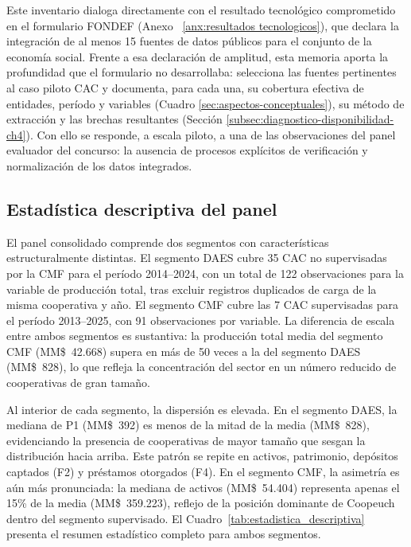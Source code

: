 Este inventario dialoga directamente con el resultado tecnológico comprometido en el formulario FONDEF (Anexo ~\ref{anx:resultados tecnologicos}), que declara la integración de al menos 15 fuentes de datos públicos para el conjunto de la economía social. Frente a esa declaración de amplitud, esta memoria aporta la profundidad que el formulario no desarrollaba: selecciona las fuentes pertinentes al caso piloto CAC y documenta, para cada una, su cobertura efectiva de entidades, período y variables (Cuadro \ref{sec:aspectos-conceptuales}), su método de extracción y las brechas resultantes (Sección \ref{subsec:diagnostico-disponibilidad-ch4}). Con ello se responde, a escala piloto, a una de las observaciones del panel evaluador del concurso: la ausencia de procesos explícitos de verificación y normalización de los datos integrados.

\subsection{Estadística descriptiva del panel}
\label{subsec:estadistica-descriptiva}
El panel consolidado comprende dos segmentos con características estructuralmente 
distintas. El segmento DAES cubre 35 CAC no supervisadas por la CMF para el período 
2014--2024, con un total de 122 observaciones para la variable de producción total, tras excluir registros duplicados de carga de la misma cooperativa y año. El segmento CMF cubre las 7 CAC supervisadas para el período 2013--2025, con 
91 observaciones por variable. La diferencia de escala entre ambos segmentos es 
sustantiva: la producción total media del segmento CMF (MM\$~42.668) supera en más 
de 50 veces a la del segmento DAES (MM\$~828), lo que refleja la concentración del 
sector en un número reducido de cooperativas de gran tamaño.

Al interior de cada segmento, la dispersión es elevada. En el segmento DAES, la 
mediana de P1 (MM\$~392) es menos de la mitad de la media (MM\$~828), evidenciando 
la presencia de cooperativas de mayor tamaño que sesgan la distribución hacia arriba. 
Este patrón se repite en activos, patrimonio, depósitos captados (F2) y préstamos 
otorgados (F4). En el segmento CMF, la asimetría es aún más pronunciada: la mediana 
de activos (MM\$~54.404) representa apenas el 15\% de la media (MM\$~359.223), 
reflejo de la posición dominante de Coopeuch dentro del segmento supervisado. El 
Cuadro~\ref{tab:estadistica_descriptiva} presenta el resumen estadístico completo 
para ambos segmentos.

